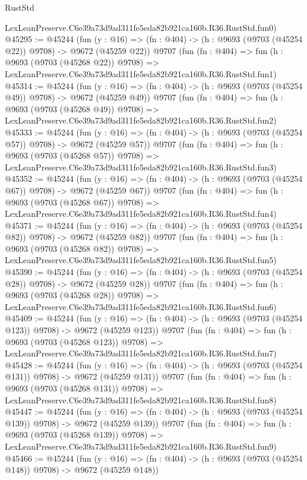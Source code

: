 \begin{lexlean}{RustStd}
\begin{coremodule}
    LexLeanPreserve.C6e39a73d9ad311fe5eda82b921ca160b.R36.RustStd.fun0)
@45295 := @45244
    (fun (y : @16) => (fn : @404) -> (h : @9693 (@9703 (@45254 @22)) @9708) -> @9672 (@45259 @22))
    @9707
    (fun (fn : @404) =>
    fun (h : @9693 (@9703 (@45268 @22)) @9708) =>
    LexLeanPreserve.C6e39a73d9ad311fe5eda82b921ca160b.R36.RustStd.fun1)
@45314 := @45244
    (fun (y : @16) => (fn : @404) -> (h : @9693 (@9703 (@45254 @49)) @9708) -> @9672 (@45259 @49))
    @9707
    (fun (fn : @404) =>
    fun (h : @9693 (@9703 (@45268 @49)) @9708) =>
    LexLeanPreserve.C6e39a73d9ad311fe5eda82b921ca160b.R36.RustStd.fun2)
@45333 := @45244
    (fun (y : @16) => (fn : @404) -> (h : @9693 (@9703 (@45254 @57)) @9708) -> @9672 (@45259 @57))
    @9707
    (fun (fn : @404) =>
    fun (h : @9693 (@9703 (@45268 @57)) @9708) =>
    LexLeanPreserve.C6e39a73d9ad311fe5eda82b921ca160b.R36.RustStd.fun3)
@45352 := @45244
    (fun (y : @16) => (fn : @404) -> (h : @9693 (@9703 (@45254 @67)) @9708) -> @9672 (@45259 @67))
    @9707
    (fun (fn : @404) =>
    fun (h : @9693 (@9703 (@45268 @67)) @9708) =>
    LexLeanPreserve.C6e39a73d9ad311fe5eda82b921ca160b.R36.RustStd.fun4)
@45371 := @45244
    (fun (y : @16) => (fn : @404) -> (h : @9693 (@9703 (@45254 @82)) @9708) -> @9672 (@45259 @82))
    @9707
    (fun (fn : @404) =>
    fun (h : @9693 (@9703 (@45268 @82)) @9708) =>
    LexLeanPreserve.C6e39a73d9ad311fe5eda82b921ca160b.R36.RustStd.fun5)
@45390 := @45244
    (fun (y : @16) => (fn : @404) -> (h : @9693 (@9703 (@45254 @28)) @9708) -> @9672 (@45259 @28))
    @9707
    (fun (fn : @404) =>
    fun (h : @9693 (@9703 (@45268 @28)) @9708) =>
    LexLeanPreserve.C6e39a73d9ad311fe5eda82b921ca160b.R36.RustStd.fun6)
@45409 := @45244
    (fun (y : @16) => (fn : @404) -> (h : @9693 (@9703 (@45254 @123)) @9708) -> @9672 (@45259 @123))
    @9707
    (fun (fn : @404) =>
    fun (h : @9693 (@9703 (@45268 @123)) @9708) =>
    LexLeanPreserve.C6e39a73d9ad311fe5eda82b921ca160b.R36.RustStd.fun7)
@45428 := @45244
    (fun (y : @16) => (fn : @404) -> (h : @9693 (@9703 (@45254 @131)) @9708) -> @9672 (@45259 @131))
    @9707
    (fun (fn : @404) =>
    fun (h : @9693 (@9703 (@45268 @131)) @9708) =>
    LexLeanPreserve.C6e39a73d9ad311fe5eda82b921ca160b.R36.RustStd.fun8)
@45447 := @45244
    (fun (y : @16) => (fn : @404) -> (h : @9693 (@9703 (@45254 @139)) @9708) -> @9672 (@45259 @139))
    @9707
    (fun (fn : @404) =>
    fun (h : @9693 (@9703 (@45268 @139)) @9708) =>
    LexLeanPreserve.C6e39a73d9ad311fe5eda82b921ca160b.R36.RustStd.fun9)
@45466 := @45244
    (fun (y : @16) => (fn : @404) -> (h : @9693 (@9703 (@45254 @148)) @9708) -> @9672 (@45259 @148))

\end{coremodule}
\end{lexlean}
